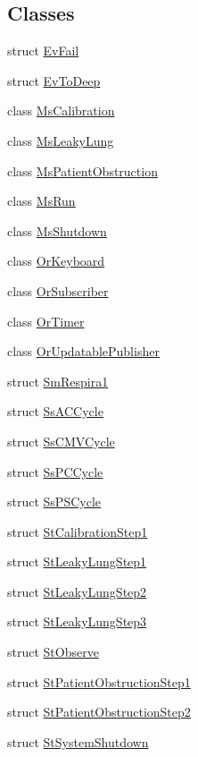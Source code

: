 \subsection*{Classes}
\begin{DoxyCompactItemize}
\item 
struct \hyperlink{structsm__respira__1_1_1EvFail}{Ev\+Fail}
\item 
struct \hyperlink{structsm__respira__1_1_1EvToDeep}{Ev\+To\+Deep}
\item 
class \hyperlink{classsm__respira__1_1_1MsCalibration}{Ms\+Calibration}
\item 
class \hyperlink{classsm__respira__1_1_1MsLeakyLung}{Ms\+Leaky\+Lung}
\item 
class \hyperlink{classsm__respira__1_1_1MsPatientObstruction}{Ms\+Patient\+Obstruction}
\item 
class \hyperlink{classsm__respira__1_1_1MsRun}{Ms\+Run}
\item 
class \hyperlink{classsm__respira__1_1_1MsShutdown}{Ms\+Shutdown}
\item 
class \hyperlink{classsm__respira__1_1_1OrKeyboard}{Or\+Keyboard}
\item 
class \hyperlink{classsm__respira__1_1_1OrSubscriber}{Or\+Subscriber}
\item 
class \hyperlink{classsm__respira__1_1_1OrTimer}{Or\+Timer}
\item 
class \hyperlink{classsm__respira__1_1_1OrUpdatablePublisher}{Or\+Updatable\+Publisher}
\item 
struct \hyperlink{structsm__respira__1_1_1SmRespira1}{Sm\+Respira1}
\item 
struct \hyperlink{structsm__respira__1_1_1SsACCycle}{Ss\+A\+C\+Cycle}
\item 
struct \hyperlink{structsm__respira__1_1_1SsCMVCycle}{Ss\+C\+M\+V\+Cycle}
\item 
struct \hyperlink{structsm__respira__1_1_1SsPCCycle}{Ss\+P\+C\+Cycle}
\item 
struct \hyperlink{structsm__respira__1_1_1SsPSCycle}{Ss\+P\+S\+Cycle}
\item 
struct \hyperlink{structsm__respira__1_1_1StCalibrationStep1}{St\+Calibration\+Step1}
\item 
struct \hyperlink{structsm__respira__1_1_1StLeakyLungStep1}{St\+Leaky\+Lung\+Step1}
\item 
struct \hyperlink{structsm__respira__1_1_1StLeakyLungStep2}{St\+Leaky\+Lung\+Step2}
\item 
struct \hyperlink{structsm__respira__1_1_1StLeakyLungStep3}{St\+Leaky\+Lung\+Step3}
\item 
struct \hyperlink{structsm__respira__1_1_1StObserve}{St\+Observe}
\item 
struct \hyperlink{structsm__respira__1_1_1StPatientObstructionStep1}{St\+Patient\+Obstruction\+Step1}
\item 
struct \hyperlink{structsm__respira__1_1_1StPatientObstructionStep2}{St\+Patient\+Obstruction\+Step2}
\item 
struct \hyperlink{structsm__respira__1_1_1StSystemShutdown}{St\+System\+Shutdown}
\end{DoxyCompactItemize}
